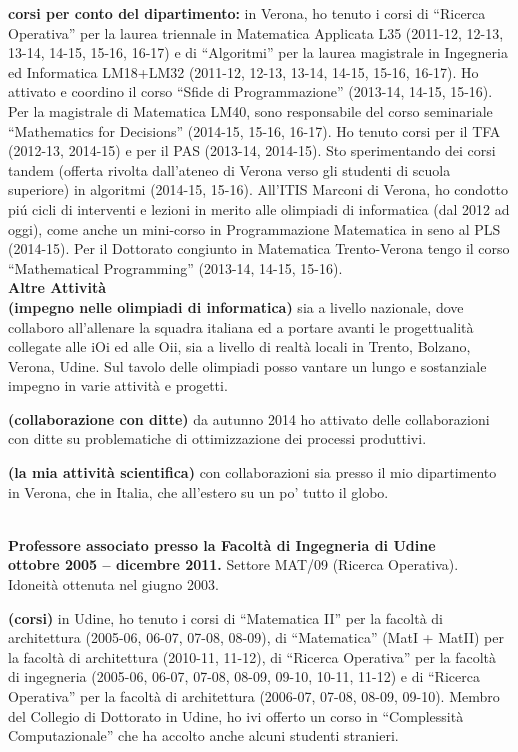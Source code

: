 \documentclass[10pt]{article}
\newcommand{\voice}[1] { \bigskip \medskip \noindent {\Large \bf #1} \medskip\\ }
\newcommand{\subvoice}[1] { {\large \bf #1} \smallskip\\ }
\begin{document}
{\bf corsi per conto del dipartimento:} in Verona,
ho tenuto i corsi
di ``Ricerca Operativa''
per la laurea triennale in Matematica Applicata L35 (2011-12, 12-13, 13-14, 14-15, 15-16, 16-17)
e di ``Algoritmi''
per la laurea magistrale in Ingegneria ed Informatica LM18+LM32 (2011-12, 12-13, 13-14, 14-15, 15-16, 16-17).
Ho attivato e coordino il corso ``Sfide di Programmazione'' (2013-14, 14-15, 15-16).
Per la magistrale di Matematica LM40, sono responsabile del corso seminariale ``Mathematics for Decisions'' (2014-15, 15-16, 16-17).
Ho tenuto corsi per il TFA (2012-13, 2014-15) e per il PAS (2013-14, 2014-15).
Sto sperimentando dei corsi tandem (offerta rivolta dall'ateneo di Verona verso gli studenti di scuola superiore) in algoritmi (2014-15, 15-16).
All'ITIS Marconi di Verona, ho condotto pi\'u cicli di interventi e lezioni in merito alle olimpiadi di informatica (dal 2012 ad oggi),
come anche un mini-corso in Programmazione Matematica in seno al PLS (2014-15). 
Per il Dottorato congiunto in Matematica Trento-Verona tengo il corso
``Mathematical Programming'' (2013-14, 14-15, 15-16).\\



\subvoice{Altre Attivit\`a}
\indent
{\bf (impegno nelle olimpiadi di informatica)}
sia a livello nazionale, dove collaboro all'allenare la squadra italiana
ed a portare avanti le progettualit\`a collegate alle iOi ed alle Oii,
sia a livello di realt\`a locali in Trento, Bolzano, Verona, Udine.
Sul tavolo delle olimpiadi posso vantare un lungo e sostanziale impegno in varie attivit\`a e progetti. 

{\bf (collaborazione con ditte)}
da autunno 2014 ho attivato delle collaborazioni con ditte
su problematiche di ottimizzazione dei processi produttivi.

{\bf (la mia attivit\`a scientifica)}
con collaborazioni sia presso il mio dipartimento in Verona, che in Italia, che all'estero su un po' tutto il globo.


\vspace{1.8mm}

\voice{{\LARGE Esperienze di lavoro}}

\subvoice{Professore associato presso la
          Facolt\`a di Ingegneria di Udine}
{\bf ottobre 2005 -- dicembre 2011.}
Settore MAT/09 (Ricerca Operativa).
Idoneit\`a ottenuta nel giugno 2003.

{\bf (corsi)} in Udine,
ho tenuto i corsi di ``Matematica II''
per la facolt\`a di architettura
(2005-06, 06-07, 07-08, 08-09),
di ``Matematica'' (MatI + MatII)
per la facolt\`a di architettura (2010-11, 11-12),
di ``Ricerca Operativa''
per la facolt\`a di ingegneria
(2005-06, 06-07, 07-08, 08-09, 09-10, 10-11, 11-12)
e di ``Ricerca Operativa''
per la facolt\`a di architettura
(2006-07, 07-08, 08-09, 09-10).
Membro del Collegio di Dottorato in Udine,
ho ivi offerto un corso in ``Complessit\`a Computazionale''
che ha accolto anche alcuni studenti stranieri.
\end{document}
